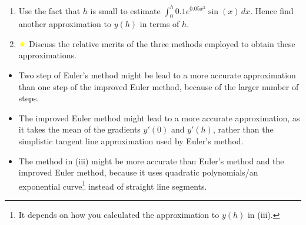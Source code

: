\documentclass[oneside]{book}
\begin{document}
\begin{example}{}{}
\begin{enumerate}[label=(\roman*)]
\begin{proof}
\begin{align*}
        \shortintertext{Since \(y(0)=0\),}
        e^{0.05h^2}y(h)&=\int_{0}^{h}\frac{1}{10}e^{0.05x^2}\sin(x)\,dx.
      \end{align*}
    \end{proof}
    \item Use the fact that \(h\) is small to estimate \(\int_{0}^{h}0.1e^{0.05x^2}\sin(x)\,dx\). Hence find another approximation to \(y(h)\) in terms of \(h\).
    \item \textcolor{yellow}{\(\bigstar\)} Discuss the relative merits of the three methods employed to obtain these approximations.
  \end{enumerate}
  \begin{itemize}
    \item Two step of Euler's method might be lead to a more accurate approximation than one step of the improved Euler method, because of the larger number of steps.
    \item The improved Euler method might lead to a more accurate approximation, as it takes the mean of the gradients \(y'(0)\) and \(y'(h)\), rather than the simplistic tangent line approximation used by Euler's method.
    \item The method in (iii) might be more accurate than Euler's method and the improved Euler method, because it uses quadratic polynomials/an exponential curve\footnote{It depends on how you calculated the approximation to \(y(h)\) in (iii).} instead of straight line segments.
  \end{itemize}
\end{example}
\end{document}
